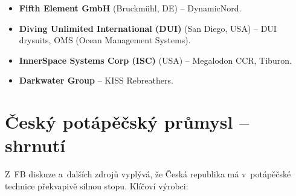 \documentclass[11pt,a4paper]{article}
\begin{document}
\begin{itemize}
\item \textbf{Fifth Element GmbH} (Bruckmühl, DE) -- DynamicNord.

\item \textbf{Diving Unlimited International (DUI)} (San Diego, USA) -- DUI drysuits, OMS (Ocean Management Systems).

\item \textbf{InnerSpace Systems Corp (ISC)} (USA) -- Megalodon CCR, Tiburon.

\item \textbf{Darkwater Group} -- KISS Rebreathers.
\end{itemize}

\section{Český potápěčský průmysl -- shrnutí}

\noindent Z~FB diskuze a~dalších zdrojů vyplývá, že Česká republika má v~potápěčské technice překvapivě silnou stopu. Klíčoví výrobci:
\end{document}
